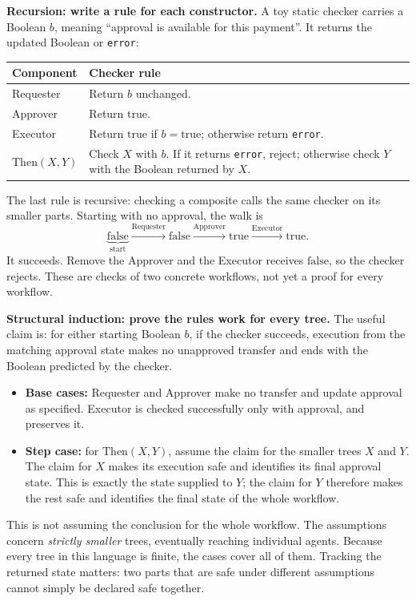 \textbf{Recursion: write a rule for each constructor.} A toy static checker carries a Boolean $b$, meaning ``approval is available for this payment''. It returns the updated Boolean or \texttt{error}:
\begin{center}
\begin{tabularx}{\textwidth}{@{}lX@{}}
\toprule
\textbf{Component} & \textbf{Checker rule}\\
\midrule
Requester & Return $b$ unchanged.\\
Approver & Return $\mathrm{true}$.\\
Executor & Return $\mathrm{true}$ if $b=\mathrm{true}$; otherwise return \texttt{error}.\\
$\mathrm{Then}(X,Y)$ & Check $X$ with $b$. If it returns \texttt{error}, reject; otherwise check $Y$ with the Boolean returned by $X$.\\
\bottomrule
\end{tabularx}
\end{center}
The last rule is recursive: checking a composite calls the same checker on its smaller parts. Starting with no approval, the walk is
\[
\underbrace{\mathrm{false}}_{\text{start}}
\xrightarrow{\text{Requester}}\mathrm{false}
\xrightarrow{\text{Approver}}\mathrm{true}
\xrightarrow{\text{Executor}}\mathrm{true}.
\]
It succeeds. Remove the Approver and the Executor receives $\mathrm{false}$, so the checker rejects. These are checks of two concrete workflows, not yet a proof for every workflow.

\textbf{Structural induction: prove the rules work for every tree.}
The useful claim is: for either starting Boolean $b$, if the checker succeeds, execution from the matching approval state makes no unapproved transfer and ends with the Boolean predicted by the checker.
\begin{itemize}
\item \textbf{Base cases:} Requester and Approver make no transfer and update approval as specified. Executor is checked successfully only with approval, and preserves it.
\item \textbf{Step case:} for $\mathrm{Then}(X,Y)$, assume the claim for the smaller trees $X$ and $Y$. The claim for $X$ makes its execution safe and identifies its final approval state. This is exactly the state supplied to $Y$; the claim for $Y$ therefore makes the rest safe and identifies the final state of the whole workflow.
\end{itemize}
This is not assuming the conclusion for the whole workflow. The assumptions concern \emph{strictly smaller} trees, eventually reaching individual agents. Because every tree in this language is finite, the cases cover all of them. Tracking the returned state matters: two parts that are safe under different assumptions cannot simply be declared safe together.

